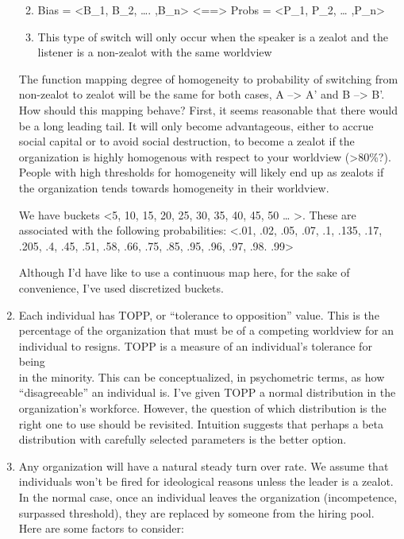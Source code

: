 \documentclass[]{article}
\providecommand{\tightlist}{%
  \setlength{\itemsep}{0pt}\setlength{\parskip}{0pt}}
\begin{document}
\begin{enumerate}
  \begin{enumerate}
  \def\labelenumii{\arabic{enumii}.}
  \tightlist
  \item
    Bias = \textless{}B\_1, B\_2, \ldots{}. ,B\_n\textgreater{}
    \textless{}==\textgreater{} Probs = \textless{}P\_1, P\_2, \ldots{}
    ,P\_n\textgreater{}
  \item
    This type of switch will only occur when the speaker is a zealot and
    the listener is a non-zealot with the same worldview
  \end{enumerate}

  The function mapping degree of homogeneity to probability of switching
  from non-zealot to zealot will be the same for both cases, A
  --\textgreater{} A' and B --\textgreater{} B'. How should this mapping
  behave? First, it seems reasonable that there would be a long leading
  tail. It will only become advantageous, either to accrue social
  capital or to avoid social destruction, to become a zealot if the
  organization is highly homogenous with respect to your worldview
  (\textgreater{}80\%?). People with high thresholds for homogeneity
  will likely end up as zealots if the organization tends towards
  homogeneity in their worldview.

  We have buckets \textless{}5, 10, 15, 20, 25, 30, 35, 40, 45, 50
  \ldots{} \textgreater{}. These are associated with the following
  probabilities: \textless{}.01, .02, .05, .07, .1, .135, .17, .205, .4,
  .45, .51, .58, .66, .75, .85, .95, .96, .97, .98. .99\textgreater{}

  Although I'd have like to use a continuous map here, for the sake of
  convenience, I've used discretized buckets.
\item
  Each individual has TOPP, or ``tolerance to opposition'' value. This
  is the percentage of the organization that must be of a competing
  worldview for an individual to resigns. TOPP is a measure of an
  individual's tolerance for being\\
  in the minority. This can be conceptualized, in psychometric terms, as
  how ``disagreeable'' an individual is. I've given TOPP a normal
  distribution in the organization's workforce. However, the question of
  which distribution is the right one to use should be revisited.
  Intuition suggests that perhaps a beta distribution with carefully
  selected parameters is the better option.
\item
  Any organization will have a natural steady turn over rate. We assume
  that individuals won't be fired for ideological reasons unless the
  leader is a zealot. In the normal case, once an individual leaves the
  organization (incompetence, surpassed threshold), they are replaced by
  someone from the hiring pool. Here are some factors to consider:


\end{enumerate}
\end{document}
